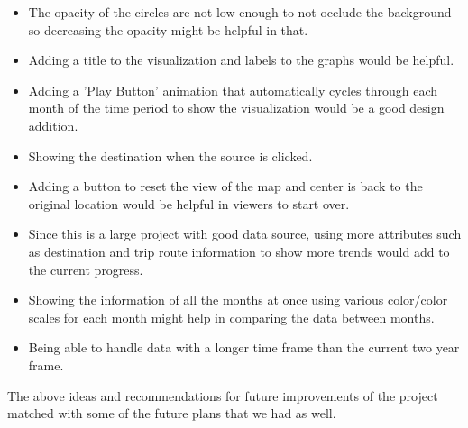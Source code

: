 \begin{enumerate}
\begin{itemize}
		\item The opacity of the circles are not low enough to not occlude the background so decreasing the opacity might be helpful in that.
		\item Adding a title to the visualization and labels to the graphs would be helpful.
		\item Adding a 'Play Button' animation that automatically cycles through each month of the time period to show the visualization would be a good design addition.
		\item Showing the destination when the source is clicked.
		\item Adding a button to reset the view of the map and center is back to the original location would be helpful in viewers to start over.
		\item Since this is a large project with good data source, using more attributes such as destination and trip route information to show more trends would add to the current progress.
		\item Showing the information of all the months at once using various color/color scales for each month might help in comparing the data between months.
		\item Being able to handle data with a longer time frame than the current two year frame.
	\end{itemize}
	The above ideas and recommendations for future improvements of the project matched with some of the future plans that we had as well.
\end{enumerate}

